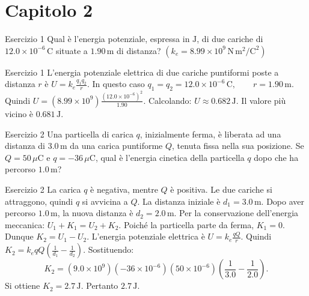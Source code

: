 \documentclass[a4paper]{article}
\begin{document}
\section{Capitolo 2}
\begin{snippetexercise}{Esercizio 1}
    Qual è l'energia potenziale, espressa in \(\mathrm{J}\), di due cariche di
    \(12.0 \times 10^{-6}\,\mathrm{C}\) situate a \(1.90\,\mathrm{m}\) di
    distanza? \(\left(k_e = 8.99 \times 10^9\,\mathrm{N\,m^2/C^2}\right)\)

\end{snippetexercise}
\begin{snippetsolution}{Esercizio 1}
    L'energia potenziale elettrica di due cariche puntiformi poste a distanza
    \(r\) è
    \(U = k_e \frac{q_1q_2}{r}.\)
    In questo caso
    \(q_1 = q_2 = 12.0 \times 10^{-6}\,\mathrm{C}, \qquad r = 1.90\,\mathrm{m}.\)
    Quindi
    \(U = \left(8.99 \times 10^9\right) \frac{ \left(12.0 \times 10^{-6}\right)^2 }{1.90}.\)
    Calcolando:
    \(U \approx 0.682\,\mathrm{J}.\)
    Il valore più vicino è
    \(\boxed{0.681\,\mathrm{J}}.\)
\end{snippetsolution}
\begin{snippetexercise}{Esercizio 2}
    Una particella di carica \(q\), inizialmente ferma, è liberata ad una
    distanza di \(3.0\,\mathrm{m}\) da una carica puntiforme \(Q\), tenuta fissa
    nella sua posizione. Se \(Q = 50\,\mu\mathrm{C}\) e
    \(q = -36\,\mu\mathrm{C}\), qual è l'energia cinetica della particella
    \(q\) dopo che ha percorso \(1.0\,\mathrm{m}\)?

\end{snippetexercise}
\begin{snippetsolution}{Esercizio 2}
    La carica \(q\) è negativa, mentre \(Q\) è positiva. Le due cariche si
    attraggono, quindi \(q\) si avvicina a \(Q\).
    La distanza iniziale è
    \(d_1 = 3.0\,\mathrm{m}.\)
    Dopo aver percorso \(1.0\,\mathrm{m}\), la nuova distanza è
    \(d_2 = 2.0\,\mathrm{m}.\)
    Per la conservazione dell'energia meccanica:
    \(U_1 + K_1 = U_2 + K_2.\)
    Poiché la particella parte da ferma,
    \(K_1 = 0.\)
    Dunque
    \(K_2 = U_1 - U_2.\)
    L'energia potenziale elettrica è
    \(U = k_e \frac{qQ}{r}.\)
    Quindi
    \(K_2 = k_e qQ \left( \frac{1}{d_1} - \frac{1}{d_2} \right).\)
    Sostituendo:
    \[
        K_2 =
        \left(9.0 \times 10^9\right)
        \left(-36 \times 10^{-6}\right)
        \left(50 \times 10^{-6}\right)
        \left(
            \frac{1}{3.0} - \frac{1}{2.0}
        \right).
    \]
    Si ottiene
    \(K_2 = 2.7\,\mathrm{J}.\)
    Pertanto
    \(\boxed{2.7\,\mathrm{J}}.\)
\end{snippetsolution}
\end{document}
